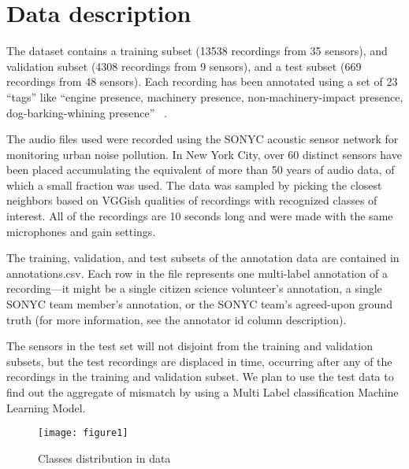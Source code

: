 \section{Data description}
The dataset contains a training subset (13538 recordings from 35 sensors), and validation subset (4308 recordings from 9 sensors), and a test subset (669 recordings from 48 sensors). Each recording has been annotated using a set of 23 “tags” like “engine presence, machinery presence, non-machinery-impact presence, dog-barking-whining presence” ~\cite{4}.

The audio files used were recorded using the SONYC acoustic sensor network for monitoring urban noise pollution. In New York City, over 60 distinct sensors have been placed accumulating the equivalent of more than 50 years of audio data, of which a small fraction was used. The data was sampled by picking the closest neighbors based on VGGish qualities of recordings with recognized classes of interest. All of the recordings are 10 seconds long and were made with the same microphones and gain settings. 

The training, validation, and test subsets of the annotation data are contained in annotations.csv. Each row in the file represents one multi-label annotation of a recording—it might be a single citizen science volunteer's annotation, a single SONYC team member's annotation, or the SONYC team's agreed-upon ground truth (for more information, see the annotator id column description).

The sensors in the test set will not disjoint from the training and validation subsets, but the test recordings are displaced in time, occurring after any of the recordings in the training and validation subset. We plan to use the test data to find out the aggregate of mismatch by using a Multi Label classification Machine Learning Model.

	
	\begin{figure}[h!]
		\texttt{[image: figure1]}
		\caption{ Classes distribution in data}
	\end{figure}
	


	
	
	
	

	
	